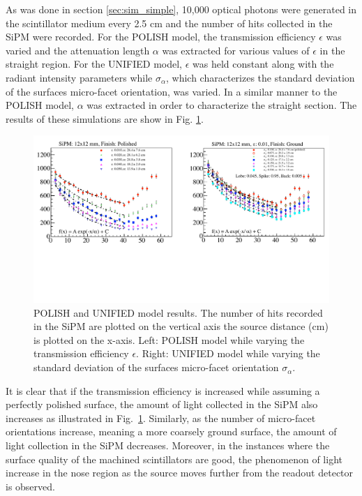 As was done in section \ref{sec:sim_simple}, 10,000 optical photons were generated in the scintillator medium every 2.5 cm and the number of hits collected in the SiPM were recorded.  For the POLISH model, the transmission efficiency $\epsilon$ was varied and the attenuation length $\alpha$ was extracted for various values of $\epsilon$ in the straight region.  For the UNIFIED model, $\epsilon$ was held constant along with the radiant intensity parameters while $\sigma_{\alpha}$, which characterizes the standard deviation of the surfaces micro-facet orientation, was varied.  In a similar manner to the POLISH model, $\alpha$ was extracted in order to characterize the straight section.  The results of these simulations are show in Fig. \ref{fig:transm_eff_vs_sig_alpha}.
	\begin{figure}[!htb]
	\centering
	\includegraphics[width=1.0\columnwidth]{simulation/figs/transm_eff_vs_sig_alpha}
	\caption{POLISH and UNIFIED model results.  The number of hits recorded in the SiPM are plotted on the vertical axis the source distance (cm) is plotted on the x-axis.  Left: POLISH model while varying the transmission efficiency $\epsilon$.  Right: UNIFIED model while varying the standard deviation of the surfaces micro-facet orientation $\sigma_{\alpha}$.}
	\label{fig:transm_eff_vs_sig_alpha}
	\end{figure}

It is clear that if the transmission efficiency is increased while assuming a perfectly polished surface, the amount of light collected in the SiPM also increases as illustrated in Fig.~\ref{fig:transm_eff_vs_sig_alpha}.  Similarly, as the number of micro-facet orientations increase, meaning a more coarsely ground surface, the amount of light collection in the SiPM decreases.  Moreover, in the instances where the surface quality of the machined scintillators are good, the phenomenon of light increase in the nose region as the source moves further from the readout detector is observed.